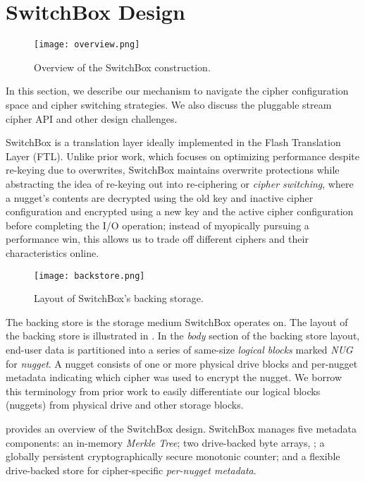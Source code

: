 \section{SwitchBox Design}\label{sec:design}

\begin{figure}[t]
   \centering
   \texttt{[image: overview.png]}
   \caption{Overview of the SwitchBox construction.}\label{fig:overview}
\end{figure}

In this section, we describe our mechanism to navigate the cipher configuration
space and cipher switching strategies. We also discuss the pluggable stream
cipher API and other design challenges.

SwitchBox is a translation layer ideally implemented in the Flash Translation
Layer (FTL). Unlike prior work, which focuses on optimizing performance despite
re-keying due to overwrites, SwitchBox maintains overwrite protections while
abstracting the idea of re-keying out into re-ciphering or \emph{cipher
switching}, where a nugget's contents are decrypted using the old key and
inactive cipher configuration and encrypted using a new key and the active
cipher configuration before completing the I/O operation; instead of myopically
pursuing a performance win, this allows us to trade off different ciphers and
their characteristics online.

\begin{figure}[t]
\centering
\texttt{[image: backstore.png]}
 \caption{Layout of SwitchBox's backing storage.}\label{fig:backstore2}
\end{figure}

The backing store is the storage medium SwitchBox operates on. The layout of the
backing store is illustrated in . In the \textit{body}
section of the backing store layout, end-user data is partitioned into a series
of same-size \emph{logical blocks} marked \textit{NUG} for \emph{nugget}. A
nugget consists of one or more physical drive blocks and per-nugget metadata
indicating which cipher was used to encrypt the nugget. We borrow this
terminology from prior work to easily differentiate our logical blocks (nuggets)
from physical drive and other storage blocks.

 provides an overview of the SwitchBox design. SwitchBox
manages five metadata components: an in-memory \emph{Merkle Tree}; two
drive-backed byte arrays, ; a globally persistent cryptographically secure
monotonic counter; and a flexible drive-backed store for cipher-specific
\emph{per-nugget metadata}.

